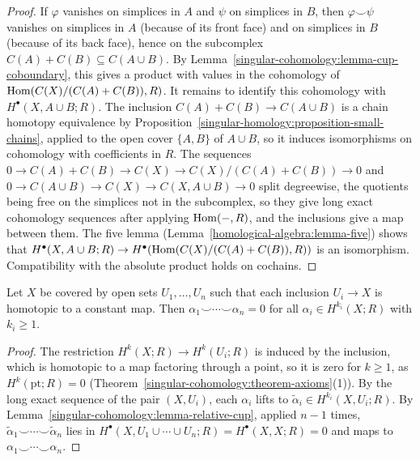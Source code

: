 \begin{proof}
If $\varphi$ vanishes on simplices in $A$ and $\psi$ on simplices in $B$, then $\varphi \smile \psi$ vanishes on simplices in $A$ (because of its front face) and on simplices in $B$ (because of its back face),
hence on the subcomplex $C(A) + C(B) \subseteq C(A \cup B)$. By Lemma~\ref{singular-cohomology:lemma-cup-coboundary}, this gives a product with values in the cohomology of
$\operatorname{Hom}(C(X)/(C(A) + C(B)), R)$. It remains to identify this cohomology with $H^\bullet(X, A \cup B; R)$. The inclusion $C(A) + C(B) \to C(A \cup B)$ is a chain homotopy equivalence by
Proposition~\ref{singular-homology:proposition-small-chains}, applied to the open cover $\{A, B\}$ of $A \cup B$, so it induces isomorphisms on cohomology with coefficients in $R$. The sequences
$0 \to C(A) + C(B) \to C(X) \to C(X)/(C(A) + C(B)) \to 0$ and $0 \to C(A \cup B) \to C(X) \to C(X, A \cup B) \to 0$ split degreewise, the quotients being free on the simplices not in the subcomplex, so
they give long exact cohomology sequences after applying $\operatorname{Hom}(-, R)$, and the inclusions give a map between them. The five lemma (Lemma~\ref{homological-algebra:lemma-five}) shows that
$H^\bullet(X, A \cup B; R) \to H^\bullet(\operatorname{Hom}(C(X)/(C(A) + C(B)), R))$ is an isomorphism. Compatibility with the absolute product holds on cochains.
\end{proof}

\begin{proposition}\label{singular-cohomology:proposition-lusternik-schnirelmann}
Let $X$ be covered by open sets $U_1, \ldots, U_n$ such that each inclusion $U_i \to X$ is homotopic to a constant map. Then $\alpha_1 \smile \cdots \smile \alpha_n = 0$ for all
$\alpha_i \in H^{k_i}(X; R)$ with $k_i \geq 1$.
\end{proposition}

\begin{proof}
The restriction $H^{k}(X; R) \to H^{k}(U_i; R)$ is induced by the inclusion, which is homotopic to a map factoring through a point, so it is zero for $k \geq 1$, as $H^k(\mathrm{pt}; R) = 0$
(Theorem~\ref{singular-cohomology:theorem-axioms}(1)). By the long exact sequence of the pair $(X, U_i)$, each $\alpha_i$ lifts to $\tilde\alpha_i \in H^{k_i}(X, U_i; R)$. By
Lemma~\ref{singular-cohomology:lemma-relative-cup}, applied $n - 1$ times, $\tilde\alpha_1 \smile \cdots \smile \tilde\alpha_n$ lies in $H^\bullet(X, U_1 \cup \cdots \cup U_n; R) = H^\bullet(X, X; R) = 0$ and
maps to $\alpha_1 \smile \cdots \smile \alpha_n$.
\end{proof}

